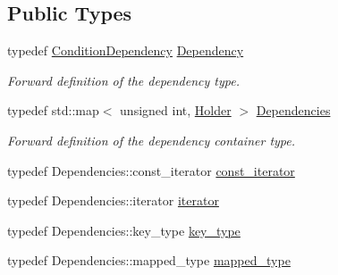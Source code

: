 \subsection*{Public Types}
\begin{DoxyCompactItemize}
\item 
typedef \hyperlink{class_d_d4hep_1_1_conditions_1_1_condition_dependency}{Condition\+Dependency} \hyperlink{class_d_d4hep_1_1_conditions_1_1_conditions_dependency_collection_a87252585d3e17ae82813c039b1b47e8a}{Dependency}
\begin{DoxyCompactList}\small\item\em Forward definition of the dependency type. \end{DoxyCompactList}\item 
typedef std\+::map$<$ unsigned int, \hyperlink{struct_d_d4hep_1_1_conditions_1_1_conditions_dependency_collection_1_1_holder}{Holder} $>$ \hyperlink{class_d_d4hep_1_1_conditions_1_1_conditions_dependency_collection_a7fb4072b6036f59389b929e312e2679c}{Dependencies}
\begin{DoxyCompactList}\small\item\em Forward definition of the dependency container type. \end{DoxyCompactList}\item 
typedef Dependencies\+::const\+\_\+iterator \hyperlink{class_d_d4hep_1_1_conditions_1_1_conditions_dependency_collection_ab5e9bcdc3330c3b694303f627799dc84}{const\+\_\+iterator}
\item 
typedef Dependencies\+::iterator \hyperlink{class_d_d4hep_1_1_conditions_1_1_conditions_dependency_collection_a685a1a6841f2fa4d70ab9a9bfb7b0b6a}{iterator}
\item 
typedef Dependencies\+::key\+\_\+type \hyperlink{class_d_d4hep_1_1_conditions_1_1_conditions_dependency_collection_a97fa0f42a622cd23c6eeb92e2b63efab}{key\+\_\+type}
\item 
typedef Dependencies\+::mapped\+\_\+type \hyperlink{class_d_d4hep_1_1_conditions_1_1_conditions_dependency_collection_a406b7e79f4192c1d4ab1cdeb500d81f4}{mapped\+\_\+type}
\end{DoxyCompactItemize}
